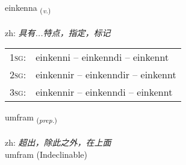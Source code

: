 \documentclass[frontgrid, backgrid]{flacards}\usepackage[]{graphicx}\usepackage[]{color}
\begin{document}
\renewcommand{\flhead}{\vskip5pt \fboxsep=0pt {\small\bfseries\footnotesize Sagnorð | 动词}}
\renewcommand{\fcfoot}{\vskip5pt \fboxsep=0pt \hspace{2pt}{\small\bfseries\footnotesize 2K}}

\renewcommand{\blhead}{\vskip5pt {\small\bfseries\footnotesize Sagnorð | 动词 }}
\renewcommand{\bcfoot}{\vskip5pt \hspace{2pt}{\small\bfseries\footnotesize 2K}}


{einkenna \small{\textsubscript{(\textit{v.})}} \\[1ex] %
\textphonetic{[eiɲcʰɛna]} \\
zh: \emph{具有...特点，指定，标记} \\  [2ex]
\renewcommand*{\arraystretch}{0.8}
\begin{tabular}{p{1cm}l}
\textsc{1sg}: & einkenni -- einkenndi -- einkennt \\ 
\textsc{2sg}: & einkennir -- einkenndir -- einkennt \\ 
\textsc{3sg}: & einkennir -- einkenndi -- einkennt \\ 
\end{tabular}
}


\renewcommand{\flhead}{\vskip5pt \fboxsep=0pt {\small\bfseries\footnotesize Forsetning | 介词}}
\renewcommand{\fcfoot}{\vskip5pt \fboxsep=0pt \hspace{2pt}{\small\bfseries\footnotesize 2K}}

\renewcommand{\blhead}{\vskip5pt {\small\bfseries\footnotesize Forsetning | 介词 }}
\renewcommand{\bcfoot}{\vskip5pt \hspace{2pt}{\small\bfseries\footnotesize 2K}}


{umfram \small{\textsubscript{(\textit{prep.})}} \\[1ex]
\textphonetic{[ʏmfram]} \\
zh: \emph{超出，除此之外，在上面} \\  [2ex]
umfram (Indeclinable)}
\end{document}
